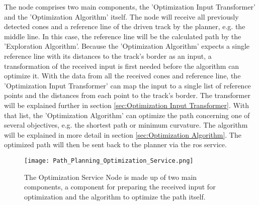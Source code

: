 The node comprises two main components, the 'Optimization Input Transformer' and the 'Optimization Algorithm' itself. The node will receive all previously detected cones and a reference line of the driven track by the planner, e.g. the middle line. In this case, the reference line will be the calculated path by the 'Exploration Algorithm'. Because the 'Optimization Algorithm' expects a single reference line with its distances to the track's border as an input, a transformation of the received input is first needed before the algorithm can optimize it. With the data from all the received cones and reference line, the 'Optimization Input Transformer' can map the input to a single list of reference points and the distances from each point to the track's border. The transformer will be explained further in section \ref{sec:Optimization Input Transformer}. With that list, the 'Optimization Algorithm' can optimize the path concerning one of several objectives, e.g. the shortest path or minimum curvature. The algorithm will be explained in more detail in section \ref{sec:Optimization Algorithm}. The optimized path will then be sent back to the planner via the \acrshort{ros} service.
\begin{figure}[H]
    \centering
    \texttt{[image: Path\_Planning\_Optimization\_Service.png]}
    \caption{The Optimization Service Node is made up of two main components, a component for preparing the received input for optimization and the algorithm to optimize the path itself.}
    \label{fig:Path Planning Optimization Service Node}
\end{figure}

